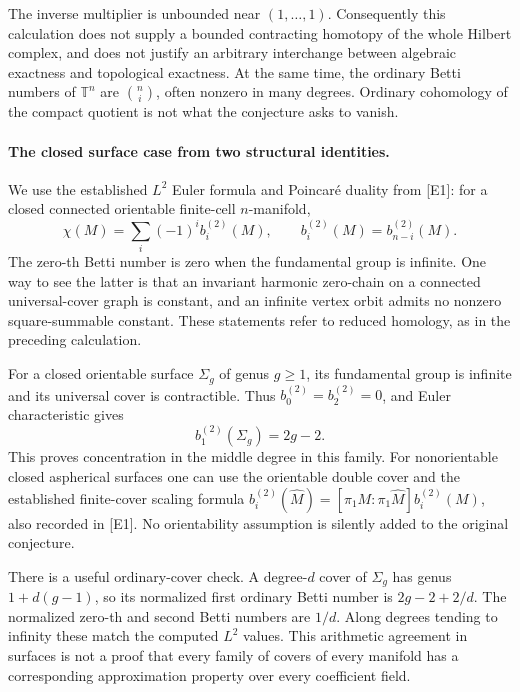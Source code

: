 \documentclass[11pt]{article}
\begin{document}
The inverse multiplier is unbounded near $(1,\ldots,1)$. Consequently
this calculation does not supply a bounded contracting homotopy of the
whole Hilbert complex, and does not justify an arbitrary interchange
between algebraic exactness and topological exactness. At the same
time, the ordinary Betti numbers of $\mathbb T^n$ are
$\binom ni$, often nonzero in many degrees. Ordinary cohomology of the
compact quotient is not what the conjecture asks to vanish.

\paragraph{The closed surface case from two structural identities.}
We use the established $L^2$ Euler formula and Poincar\'e duality from
[E1]: for a closed connected orientable finite-cell $n$-manifold,
\[
 \chi(M)=\sum_i(-1)^ib_i^{(2)}(M),
 \qquad b_i^{(2)}(M)=b_{n-i}^{(2)}(M).
\]
The zero-th Betti number is zero when the fundamental group is infinite.
One way to see the latter is that an invariant harmonic zero-chain on
a connected universal-cover graph is constant, and an infinite vertex
orbit admits no nonzero square-summable constant. These statements
refer to reduced homology, as in the preceding calculation.

For a closed orientable surface $\Sigma_g$ of genus $g\ge1$, its
fundamental group is infinite and its universal cover is contractible.
Thus $b_0^{(2)}=b_2^{(2)}=0$, and Euler characteristic gives
\[
                         b_1^{(2)}(\Sigma_g)=2g-2.
\]
This proves concentration in the middle degree in this family. For
nonorientable closed aspherical surfaces one can use the orientable
double cover and the established finite-cover scaling formula
$b_i^{(2)}(\widehat M)=[\pi_1M:\pi_1\widehat M]b_i^{(2)}(M)$,
also recorded in [E1]. No orientability assumption is silently added
to the original conjecture.

There is a useful ordinary-cover check. A degree-$d$ cover of
$\Sigma_g$ has genus $1+d(g-1)$, so its normalized first ordinary
Betti number is $2g-2+2/d$. The normalized zero-th and second Betti
numbers are $1/d$. Along degrees tending to infinity these match the
computed $L^2$ values. This arithmetic agreement in surfaces is not
a proof that every family of covers of every manifold has a corresponding
approximation property over every coefficient field.
\end{document}
